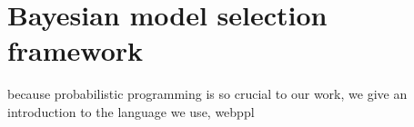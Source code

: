 \documentclass{article}
\newcommand{\cas}[1]{ \textsf{\color{darkgray} \scriptsize #1} }
\begin{document}


\section{Bayesian model selection framework}
\label{s:bayes}



\cas{because probabilistic programming is so crucial to our work, we give an introduction to the language we use, webppl}
\end{document}
